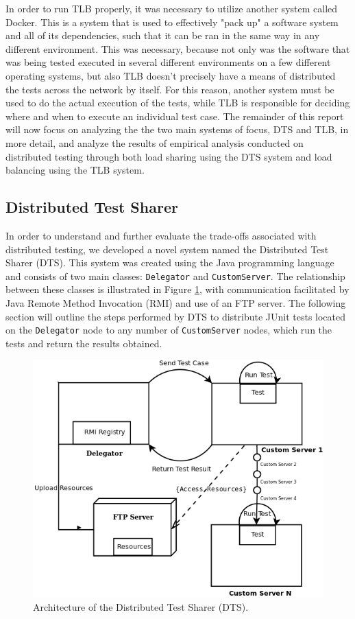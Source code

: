 \documentclass{article}
\begin{document}
{In order to run TLB properly, it was necessary to utilize another system called Docker. This is a system that is used to effectively "pack up" a software system and all of its dependencies, such that it can be ran in the same way in any different environment. This was necessary, because not only was the software that was being tested executed in several different environments on a few different operating systems, but also TLB doesn't precisely have a means of distributed the tests across the network by itself. For this reason, another system must be used to do the actual execution of the tests, while TLB is responsible for deciding where and when to execute an individual test case. The remainder of this report will now focus on analyzing the the two main systems of focus, DTS and TLB, in more detail, and analyze the results of empirical analysis conducted on distributed testing through both load sharing using the DTS system and load balancing using the TLB system.

\subsection{Distributed Test Sharer}
\label{sharer}
In order to understand and further evaluate the trade-offs associated with distributed testing, we developed a novel system named the Distributed Test Sharer (DTS).  This system was created using the Java programming language and consists of two main classes: \texttt{Delegator} and \texttt{CustomServer}.  The relationship between these classes is illustrated in Figure \ref{dtsdiagram}, with communication facilitated by Java Remote Method Invocation (RMI) and use of an FTP server.  The following section will outline the steps performed by DTS to distribute JUnit tests located on the \texttt{Delegator} node to any number of \texttt{CustomServer} nodes, which run the tests and return the results obtained.

\begin{figure}[H]
\includegraphics[width = \textwidth]{DTS_Diagram.png}
\caption{Architecture of the Distributed Test Sharer (DTS).}
\label{dtsdiagram}
\end{figure}

}
\end{document}
